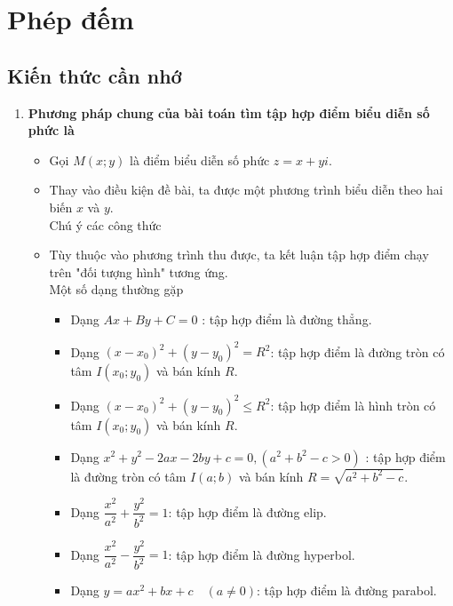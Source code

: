 \setcounter{ex}{0}
\section{Phép đếm}
\subsection{Kiến thức cần nhớ}
\begin{khung}
	\begin{enumerate}[\color{violet}\faCubes]
		\item \textbf{Phương pháp chung của bài toán tìm tập hợp điểm biểu diễn số phức là}
		\begin{itemize}
			\item  Gọi $M(x;y)$ là điểm biểu diễn số phức $z=x+yi$.
			\item  Thay vào điều kiện đề bài, ta được một phương trình biểu diễn theo hai biến $x$ và $y$.\\
		
				Chú ý các công thức
		
			\item  Tùy thuộc vào phương trình thu được, ta kết luận tập hợp điểm chạy trên "đối tượng hình" tương ứng.\\
			Một số dạng thường gặp
			\begin{itemize}
				\item [\color{violet} \faCaretRight] Dạng $Ax+By+C=0$ : tập hợp điểm là đường thẳng.
				\item [\color{violet} \faCaretRight] Dạng $(x-x_0)^2+(y-y_0)^2=R^2$: tập hợp điểm là đường tròn có tâm $I(x_0;y_0)$ và bán kính $R$.
				\item [\color{violet} \faCaretRight] Dạng $(x-x_0)^2+(y-y_0)^2\leq R^2$: tập hợp điểm là hình tròn có tâm $I(x_0;y_0)$ và bán kính $R$.
				\item [\color{violet} \faCaretRight]	Dạng $x^2+y^2-2ax-2by+c=0, (a^2+b^2-c>0)$ : tập hợp điểm là đường tròn có tâm $I(a;b)$ và bán kính $R=\sqrt{a^2+b^2-c}$.
				\item [\color{violet} \faCaretRight]	Dạng $\dfrac{x^2}{a^2}+\dfrac{y^2}{b^2}=1$: tập hợp điểm là đường elip.
			\item [\color{violet} \faCaretRight]	Dạng $\dfrac{x^2}{a^2}-\dfrac{y^2}{b^2}=1$: tập hợp điểm là đường hyperbol.
			\item [\color{violet} \faCaretRight]	Dạng $y=ax^2+bx+c \quad (a\neq 0)$: tập hợp điểm là đường parabol.
					\end{itemize}
		\end{itemize}
	
	\end{enumerate}
	\end{khung}
